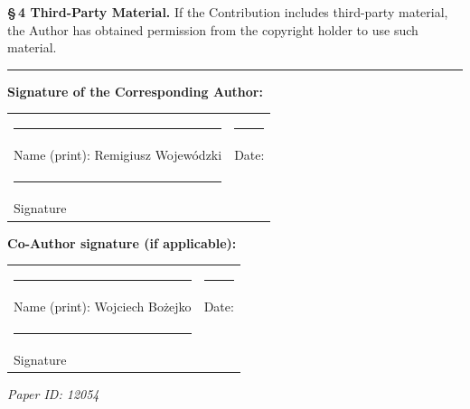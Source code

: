 \documentclass[11pt]{article}
\begin{document}
\vspace{6pt}
\textbf{§\,4 Third-Party Material.}
If the Contribution includes third-party material, the Author has
obtained permission from the copyright holder to use such material.

\vspace{16pt}
\hrule
\vspace{16pt}

\textbf{Signature of the Corresponding Author:}

\vspace{30pt}

\begin{tabular}{@{}p{}p{}@{}}
\rule{6cm}{0.4pt} & \rule{6cm}{0.4pt} \\
Name (print): Remigiusz Wojew\'{o}dzki & Date: \hspace{3cm} \\[20pt]
\rule{6cm}{0.4pt} & \\
Signature & \\
\end{tabular}

\vspace{20pt}

\textbf{Co-Author signature (if applicable):}

\vspace{30pt}

\begin{tabular}{@{}p{}p{}@{}}
\rule{6cm}{0.4pt} & \rule{6cm}{0.4pt} \\
Name (print): Wojciech Bo\.{z}ejko & Date: \hspace{3cm} \\[20pt]
\rule{6cm}{0.4pt} & \\
Signature & \\
\end{tabular}

\vspace{20pt}
{\small\textit{Paper ID: 12054}}
\end{document}

